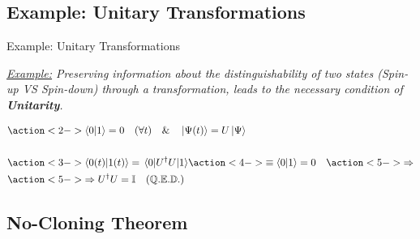 \documentclass[9pt, handout, aspectratio=169]{beamer}	%
\begin{document}

	\subsection{Example: Unitary Transformations}

	\begin{frame}{Example: Unitary Transformations}

		\textit{\underline{Example:} Preserving information about the distinguishability of two states (Spin-up VS Spin-down) through a transformation, leads to the necessary condition of \textbf{Unitarity}.}

		\begin{align*}
			&\action<2->{ \braket{0}{1} =0 \quad (\forall t) \quad \& \quad \ket{\Psi (t)} = U\ket{\Psi} } \\
			 \\
			&\action<3->{ \braket{0(t)}{1(t)} = \mel{0}{U^\dagger U}{1} } \action<4->{ \equiv \braket{0}{1}=0 \quad } \action<5->{ \Rightarrow } \\
			&\action<5->{ \Rightarrow U^\dagger U = \mathbb{I} \quad \mathbb{(Q.E.D.)} }
		\end{align*}


	\end{frame}



	\subsection{No-Cloning Theorem}
\end{document}
